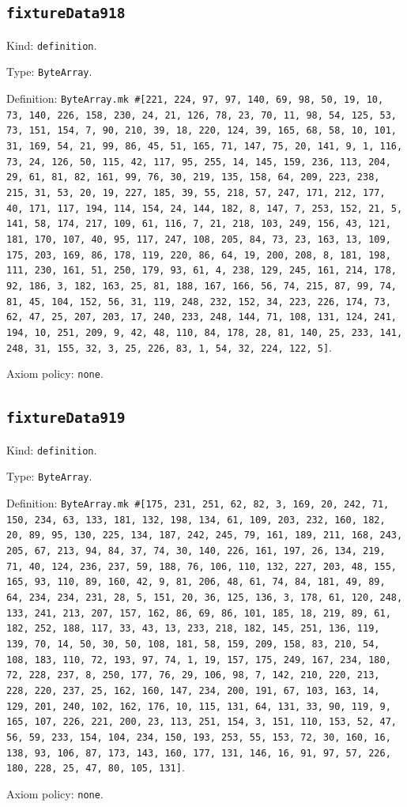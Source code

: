 \documentclass[11pt]{article}
\begin{document}
\subsection*{\texttt{fixtureData918}}
\noindent Kind: \texttt{definition}.\par
\noindent Type: \texttt{ByteArray}.\par
\noindent Definition: \texttt{ByteArray.mk \#[221, 224, 97, 97, 140, 69, 98, 50, 19, 10, 73, 140, 226, 158, 230, 24, 21, 126, 78, 23, 70, 11, 98, 54, 125, 53, 73, 151, 154, 7, 90, 210, 39, 18, 220, 124, 39, 165, 68, 58, 10, 101, 31, 169, 54, 21, 99, 86, 45, 51, 165, 71, 147, 75, 20, 141, 9, 1, 116, 73, 24, 126, 50, 115, 42, 117, 95, 255, 14, 145, 159, 236, 113, 204, 29, 61, 81, 82, 161, 99, 76, 30, 219, 135, 158, 64, 209, 223, 238, 215, 31, 53, 20, 19, 227, 185, 39, 55, 218, 57, 247, 171, 212, 177, 40, 171, 117, 194, 114, 154, 24, 144, 182, 8, 147, 7, 253, 152, 21, 5, 141, 58, 174, 217, 109, 61, 116, 7, 21, 218, 103, 249, 156, 43, 121, 181, 170, 107, 40, 95, 117, 247, 108, 205, 84, 73, 23, 163, 13, 109, 175, 203, 169, 86, 178, 119, 220, 86, 64, 19, 200, 208, 8, 181, 198, 111, 230, 161, 51, 250, 179, 93, 61, 4, 238, 129, 245, 161, 214, 178, 92, 186, 3, 182, 163, 25, 81, 188, 167, 166, 56, 74, 215, 87, 99, 74, 81, 45, 104, 152, 56, 31, 119, 248, 232, 152, 34, 223, 226, 174, 73, 62, 47, 25, 207, 203, 17, 240, 233, 248, 144, 71, 108, 131, 124, 241, 194, 10, 251, 209, 9, 42, 48, 110, 84, 178, 28, 81, 140, 25, 233, 141, 248, 31, 155, 32, 3, 25, 226, 83, 1, 54, 32, 224, 122, 5]}.\par
\noindent Axiom policy: \texttt{none}.\par
\subsection*{\texttt{fixtureData919}}
\noindent Kind: \texttt{definition}.\par
\noindent Type: \texttt{ByteArray}.\par
\noindent Definition: \texttt{ByteArray.mk \#[175, 231, 251, 62, 82, 3, 169, 20, 242, 71, 150, 234, 63, 133, 181, 132, 198, 134, 61, 109, 203, 232, 160, 182, 20, 89, 95, 130, 225, 134, 187, 242, 245, 79, 161, 189, 211, 168, 243, 205, 67, 213, 94, 84, 37, 74, 30, 140, 226, 161, 197, 26, 134, 219, 71, 40, 124, 236, 237, 59, 188, 76, 106, 110, 132, 227, 203, 48, 155, 165, 93, 110, 89, 160, 42, 9, 81, 206, 48, 61, 74, 84, 181, 49, 89, 64, 234, 234, 231, 28, 5, 151, 20, 36, 125, 136, 3, 178, 61, 120, 248, 133, 241, 213, 207, 157, 162, 86, 69, 86, 101, 185, 18, 219, 89, 61, 182, 252, 188, 117, 33, 43, 13, 233, 218, 182, 145, 251, 136, 119, 139, 70, 14, 50, 30, 50, 108, 181, 58, 159, 209, 158, 83, 210, 54, 108, 183, 110, 72, 193, 97, 74, 1, 19, 157, 175, 249, 167, 234, 180, 72, 228, 237, 8, 250, 177, 76, 29, 106, 98, 7, 142, 210, 220, 213, 228, 220, 237, 25, 162, 160, 147, 234, 200, 191, 67, 103, 163, 14, 129, 201, 240, 102, 162, 176, 10, 115, 131, 64, 131, 33, 90, 119, 9, 165, 107, 226, 221, 200, 23, 113, 251, 154, 3, 151, 110, 153, 52, 47, 56, 59, 233, 154, 104, 234, 150, 193, 253, 55, 153, 72, 30, 160, 16, 138, 93, 106, 87, 173, 143, 160, 177, 131, 146, 16, 91, 97, 57, 226, 180, 228, 25, 47, 80, 105, 131]}.\par
\noindent Axiom policy: \texttt{none}.\par
\end{document}
